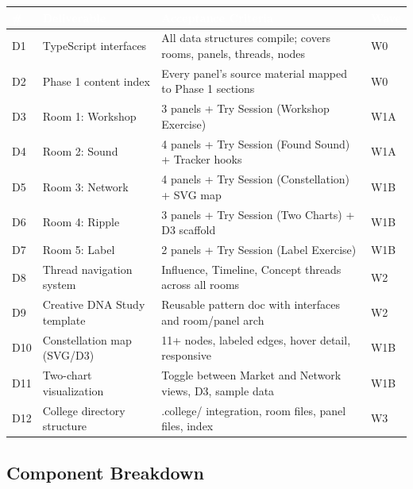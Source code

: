 \documentclass[11pt,letterpaper]{article}
\newcommand{\tableheader}[1]{\textbf{\sffamily\textcolor{white}{#1}}}
\begin{document}
\begin{center}
\begin{tabularx}{\textwidth}{C{0.8cm}L{3.5cm}XL{2cm}}
\toprule
{}
\tableheader{\#} & \tableheader{Deliverable} & \tableheader{Acceptance Criteria} & \tableheader{Wave} \\
\midrule
D1 & TypeScript interfaces & All data structures compile; covers rooms, panels, threads, nodes & W0 \\
D2 & Phase 1 content index & Every panel's source material mapped to Phase 1 sections & W0 \\
D3 & Room 1: Workshop & 3 panels + Try Session (Workshop Exercise) & W1A \\
D4 & Room 2: Sound & 4 panels + Try Session (Found Sound) + Tracker hooks & W1A \\
D5 & Room 3: Network & 4 panels + Try Session (Constellation) + SVG map & W1B \\
D6 & Room 4: Ripple & 3 panels + Try Session (Two Charts) + D3 scaffold & W1B \\
D7 & Room 5: Label & 2 panels + Try Session (Label Exercise) & W1B \\
D8 & Thread navigation system & Influence, Timeline, Concept threads across all rooms & W2 \\
D9 & Creative DNA Study template & Reusable pattern doc with interfaces and room/panel arch & W2 \\
D10 & Constellation map (SVG/D3) & 11+ nodes, labeled edges, hover detail, responsive & W1B \\
D11 & Two-chart visualization & Toggle between Market and Network views, D3, sample data & W1B \\
D12 & College directory structure & .college/ integration, room files, panel files, index & W3 \\
\bottomrule
\end{tabularx}
\end{center}

\subsection{Component Breakdown}
\end{document}
